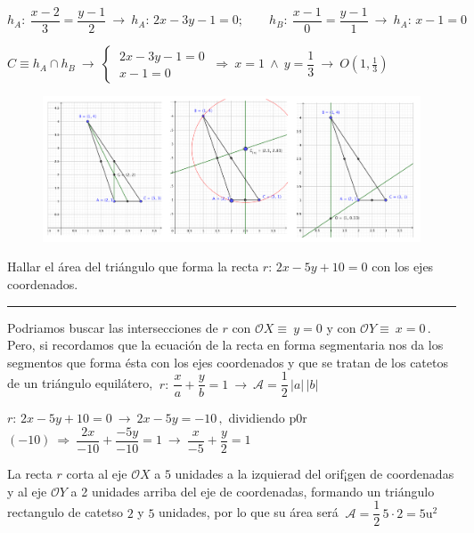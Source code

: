 \begin{miejercicio}
\vspace{3mm} $h_A:\ \dfrac{x-2}{3}=\dfrac{y-1}{2} \ \to \ h_A:\, 2x-3y-1=0 ;\qquad h_B:\ \dfrac{x-1}{0}=\dfrac{y-1}{1} \ \to \ h_A:\, x-1=0$

\vspace{2mm} $C\equiv h_A \cap h_B \ \to \ \begin{cases} \ 2x-3y-1=0 \\ \ x-1=0 \end{cases} \ \Rightarrow \ x=1 \ \wedge \ y=\dfrac {1}{3} \ \longrightarrow \ O\left( 1,\frac 1 3  \right)$

	
\end{miejercicio}

\begin{figure}[H]
	\centering
	\includegraphics[width=1\textwidth]{img-ga/ga29.png}
\end{figure}

\begin{miejercicio}

Hallar el área del triángulo que forma la recta $r:\, 2x-5y+10=0$ con los ejes coordenados.

\rule{250pt}{0.1pt}

\vspace{2mm} Podriamos buscar las intersecciones de $r$ con $\mathcal OX\equiv \ y=0$ y con $\mathcal OY\equiv \ x=0\, . \ $ Pero, si recordamos que la ecuación de la recta en forma segmentaria nos da los segmentos que forma ésta con los ejes coordenados y que se tratan de los catetos de un triángulo equilátero, $ \ r:\ \dfrac x a + \dfrac y b = 1 \ \to \ \mathcal A= \dfrac 12 \, |a| \, |b|$ 

\vspace{2mm} $r:\, 2x-5y+10=0 \ \to \ 2x-5y=-10\, , $ dividiendo p0r $(-10)\ \Rightarrow \ \dfrac{2x}{-10}+\dfrac{-5y}{-10}=1 \ \to \ \dfrac{x}{-5}+\dfrac{y}{2}=1$

\vspace{2mm} La recta $r$ corta al eje $\mathcal OX$ a $5$ unidades a la izquierad del orif¡gen de coordenadas y al eje $\mathcal OY$ a 2 unidades arriba del eje de coordenadas, formando un triángulo rectangulo de catetso $2$ y $5$ unidades, por lo que su área será $\ \mathcal A=\dfrac 1 2\, 5 \cdot 2 = 5 \mathrm{u}^2$
	
\end{miejercicio}


